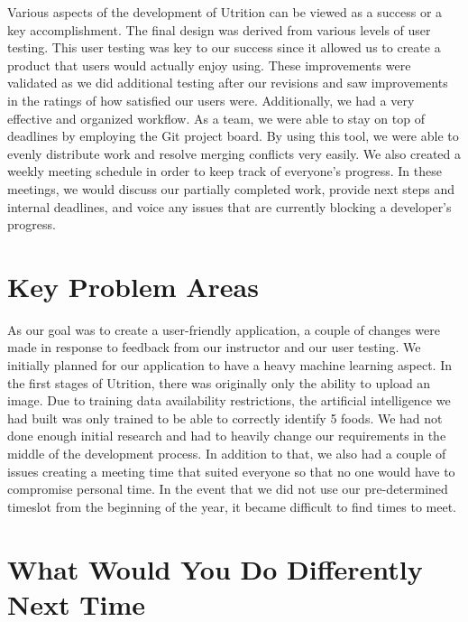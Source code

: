 \documentclass{article}
\begin{document}
Various aspects of the development of Utrition can be viewed as a success or a key accomplishment. The final design was derived from various levels of user testing. This user testing was key to our success since it allowed us to create a product that users would actually enjoy using. These improvements were validated as we did additional testing after our revisions and saw improvements in the ratings of how satisfied our users were. Additionally, we had a very effective and organized workflow. As a team, we were able to stay on top of deadlines by employing the Git project board. By using this tool, we were able to evenly distribute work and resolve merging conflicts very easily. We also created a weekly meeting schedule in order to keep track of everyone's progress. In these meetings, we would discuss our partially completed work, provide next steps and internal deadlines, and voice any issues that are currently blocking a developer's progress. 

\section{Key Problem Areas}


  As our goal was to create a user-friendly application, a couple of changes were made in response to feedback from our instructor and our user testing. We initially planned for our application to have a heavy machine learning aspect. In the first stages of Utrition, there was originally only the ability to upload an image. Due to training data availability restrictions, the artificial intelligence we had built was only trained to be able to correctly identify 5 foods. We had not done enough initial research and had to heavily change our requirements in the middle of the development process. In addition to that, we also had a couple of issues creating a meeting time that suited everyone so that no one would have to compromise personal time. In the event that we did not use our pre-determined timeslot from the beginning of the year, it became difficult to find times to meet. 



\section{What Would You Do Differently Next Time}
\end{document}
